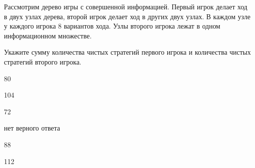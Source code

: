 
\begin{question}
Рассмотрим дерево игры с совершенной информацией. Первый игрок делает
ход в двух узлах дерева, второй игрок делает ход в других двух узлах. В
каждом узле у каждого игрока 8 вариантов хода. Узлы второго игрока лежат
в одном информационном множестве.

Укажите сумму количества чистых стратегий первого игрока и количества
чистых стратегий второго игрока.
\begin{answerlist}
  \item 80
  \item 104
  \item 72
  \item нет верного ответа
  \item 88
  \item 112
\end{answerlist}
\end{question}


